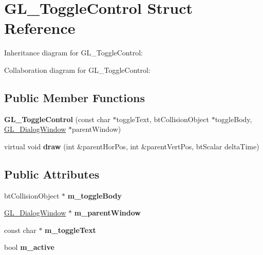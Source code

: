 \hypertarget{struct_g_l___toggle_control}{\section{G\+L\+\_\+\+Toggle\+Control Struct Reference}
\label{struct_g_l___toggle_control}
}


Inheritance diagram for G\+L\+\_\+\+Toggle\+Control\+:


Collaboration diagram for G\+L\+\_\+\+Toggle\+Control\+:
\subsection*{Public Member Functions}
\begin{DoxyCompactItemize}
\item 
\hypertarget{struct_g_l___toggle_control_aaeee14a085db1a4d9029e90963a44b5b}{{\bfseries G\+L\+\_\+\+Toggle\+Control} (const char $\ast$toggle\+Text, bt\+Collision\+Object $\ast$toggle\+Body, \hyperlink{class_g_l___dialog_window}{G\+L\+\_\+\+Dialog\+Window} $\ast$parent\+Window)}\label{struct_g_l___toggle_control_aaeee14a085db1a4d9029e90963a44b5b}

\item 
\hypertarget{struct_g_l___toggle_control_ad57c09537ad7cdb94ac9785cdf57fac8}{virtual void {\bfseries draw} (int \&parent\+Hor\+Pos, int \&parent\+Vert\+Pos, bt\+Scalar delta\+Time)}\label{struct_g_l___toggle_control_ad57c09537ad7cdb94ac9785cdf57fac8}

\end{DoxyCompactItemize}
\subsection*{Public Attributes}
\begin{DoxyCompactItemize}
\item 
\hypertarget{struct_g_l___toggle_control_ab128ff8445ea244ecad1d357cead07e5}{bt\+Collision\+Object $\ast$ {\bfseries m\+\_\+toggle\+Body}}\label{struct_g_l___toggle_control_ab128ff8445ea244ecad1d357cead07e5}

\item 
\hypertarget{struct_g_l___toggle_control_a543acf7228d60184c1e6c4027a6d9036}{\hyperlink{class_g_l___dialog_window}{G\+L\+\_\+\+Dialog\+Window} $\ast$ {\bfseries m\+\_\+parent\+Window}}\label{struct_g_l___toggle_control_a543acf7228d60184c1e6c4027a6d9036}

\item 
\hypertarget{struct_g_l___toggle_control_aea0e71cd301e9d3030774ca69de0f6b7}{const char $\ast$ {\bfseries m\+\_\+toggle\+Text}}\label{struct_g_l___toggle_control_aea0e71cd301e9d3030774ca69de0f6b7}

\item 
\hypertarget{struct_g_l___toggle_control_a2e14e2c79a676c0619646df15ddfe9e4}{bool {\bfseries m\+\_\+active}}\label{struct_g_l___toggle_control_a2e14e2c79a676c0619646df15ddfe9e4}

\end{DoxyCompactItemize}
